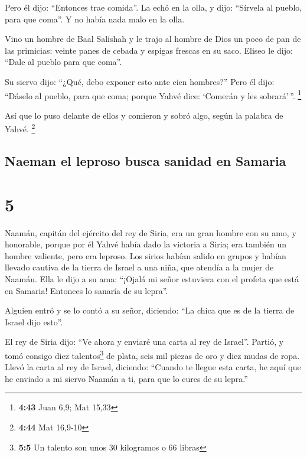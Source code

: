  Pero él dijo: ``Entonces trae comida''. La echó en la
olla, y dijo: ``Sírvela al pueblo, para que coma''. Y no había nada malo
en la olla.

 Vino un hombre de Baal Salishah y le trajo al hombre de
Dios un poco de pan de las primicias: veinte panes de cebada y espigas
frescas en su saco. Eliseo le dijo: ``Dale al pueblo para que coma''.

 Su siervo dijo: ``¿Qué, debo exponer esto ante cien
hombres?'' Pero él dijo: ``Dáselo al pueblo, para que coma; porque Yahvé
dice: `Comerán y les sobrará'\,''. \footnote{\textbf{4:43} Juan 6,9; Mat
  15,33}

 Así que lo puso delante de ellos y comieron y sobró
algo, según la palabra de Yahvé. \footnote{\textbf{4:44} Mat 16,9-10}

\hypertarget{naeman-el-leproso-busca-sanidad-en-samaria}{%
\subsection{Naeman el leproso busca sanidad en
Samaria}\label{naeman-el-leproso-busca-sanidad-en-samaria}}

\hypertarget{section-4}{%
\section{5}\label{section-4}}

 Naamán, capitán del ejército del rey de Siria, era un
gran hombre con su amo, y honorable, porque por él Yahvé había dado la
victoria a Siria; era también un hombre valiente, pero era leproso.
 Los sirios habían salido en grupos y habían llevado
cautiva de la tierra de Israel a una niña, que atendía a la mujer de
Naamán.  Ella le dijo a su ama: ``¡Ojalá mi señor
estuviera con el profeta que está en Samaria! Entonces lo sanaría de su
lepra''.

 Alguien entró y se lo contó a su señor, diciendo: ``La
chica que es de la tierra de Israel dijo esto''.

 El rey de Siria dijo: ``Ve ahora y enviaré una carta al
rey de Israel''. Partió, y tomó consigo diez talentos\footnote{\textbf{5:5}
  Un talento son unos 30 kilogramos o 66 libras} de plata, seis mil
piezas de oro y diez mudas de ropa.  Llevó la carta al rey
de Israel, diciendo: ``Cuando te llegue esta carta, he aquí que he
enviado a mi siervo Naamán a ti, para que lo cures de su lepra.''

